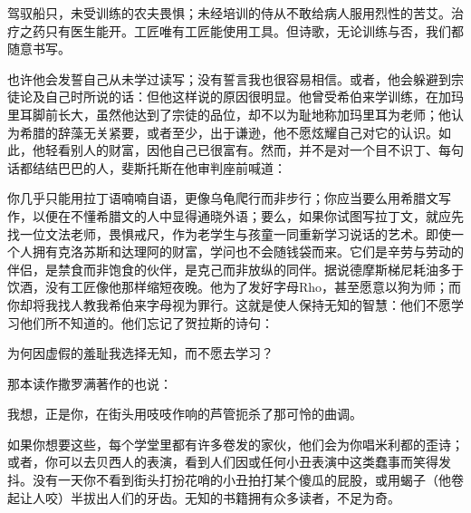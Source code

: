 驾驭船只，未受训练的农夫畏惧；\newline{}未经培训的侍从不敢给病人\newline{}服用烈性的苦艾。治疗之药\newline{}只有医生能开。工匠\newline{}唯有工匠能使用工具。但诗歌，\newline{}无论训练与否，我们都随意书写。\par

也许他会发誓自己从未学过读写；没有誓言我也很容易相信。或者，他会躲避到宗徒论及自己时所说的话：但他这样说的原因很明显。他曾受希伯来学训练，在加玛里耳脚前长大，虽然他达到了宗徒的品位，却不以为耻地称加玛里耳为老师；他认为希腊的辞藻无关紧要，或者至少，出于谦逊，他不愿炫耀自己对它的认识。如此，他轻看别人的财富，因他自己已很富有。然而，并不是对一个目不识丁、每句话都结结巴巴的人，斐斯托斯在他审判座前喊道：\par

你几乎只能用拉丁语喃喃自语，更像乌龟爬行而非步行；你应当要么用希腊文写作，以便在不懂希腊文的人中显得通晓外语；要么，如果你试图写拉丁文，就应先找一位文法老师，畏惧戒尺，作为老学生与孩童一同重新学习说话的艺术。即使一个人拥有克洛苏斯和达理阿的财富，学问也不会随钱袋而来。它们是辛劳与劳动的伴侣，是禁食而非饱食的伙伴，是克己而非放纵的同伴。据说德摩斯梯尼耗油多于饮酒，没有工匠像他那样缩短夜晚。他为了发好字母Rho，甚至愿意以狗为师；而你却将我找人教我希伯来字母视为罪行。这就是使人保持无知的智慧：他们不愿学习他们所不知道的。他们忘记了贺拉斯的诗句：\par

为何因虚假的羞耻我选择无知，\newline{}而不愿去学习？\par

那本读作撒罗满著作的也说：\par

我想，正是你，在街头用吱吱作响的芦管\newline{}扼杀了那可怜的曲调。\par

如果你想要这些，每个学堂里都有许多卷发的家伙，他们会为你唱米利都的歪诗；或者，你可以去贝西人的表演，看到人们因或任何小丑表演中这类蠢事而笑得发抖。没有一天你不看到街头打扮花哨的小丑拍打某个傻瓜的屁股，或用蝎子（他卷起让人咬）半拔出人们的牙齿。无知的书籍拥有众多读者，不足为奇。\par

